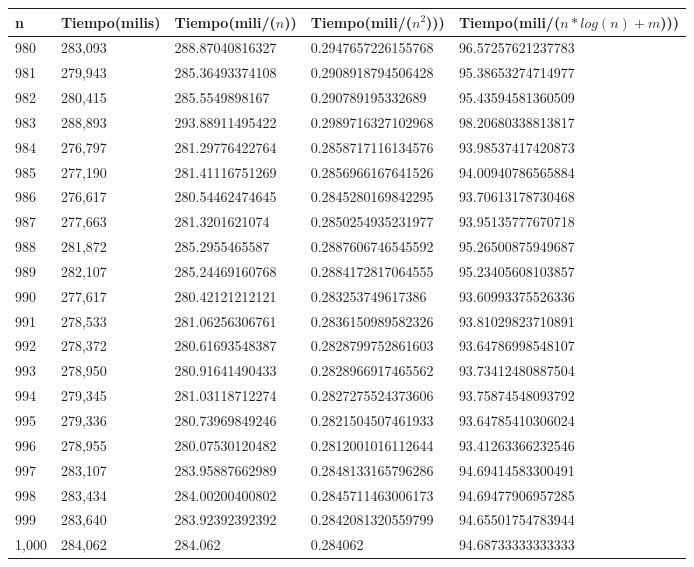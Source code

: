 \begin{table}[H]
\parbox{0.3\textwidth}{
    \begin{tabular}{ | l | l | l | l | l |}
    \hline
n   &Tiempo(milis) &Tiempo(mili/($n$)) &Tiempo(mili/($n^2$))) &Tiempo(mili/($n*log(n) + m$)))\\ \hline
980	&283,093	&288.87040816327	&0.2947657226155768	&96.57257621237783\\ \hline
981	&279,943	&285.36493374108	&0.2908918794506428	&95.38653274714977\\ \hline
982	&280,415	&285.5549898167	    &0.290789195332689	&95.43594581360509\\ \hline
983	&288,893	&293.88911495422	&0.2989716327102968	&98.20680338813817\\ \hline
984	&276,797	&281.29776422764	&0.2858717116134576	&93.98537417420873\\ \hline
985	&277,190	&281.41116751269	&0.2856966167641526	&94.00940786565884\\ \hline
986	&276,617	&280.54462474645	&0.2845280169842295	&93.70613178730468\\ \hline
987	&277,663	&281.3201621074	    &0.2850254935231977	&93.95135777670718\\ \hline
988	&281,872	&285.2955465587	    &0.2887606746545592	&95.26500875949687\\ \hline
989	&282,107	&285.24469160768	&0.2884172817064555	&95.23405608103857\\ \hline
990	&277,617	&280.42121212121	&0.283253749617386	&93.60993375526336\\ \hline
991	&278,533	&281.06256306761	&0.2836150989582326	&93.81029823710891\\ \hline
992	&278,372	&280.61693548387	&0.2828799752861603	&93.64786998548107\\ \hline
993	&278,950	&280.91641490433	&0.2828966917465562	&93.73412480887504\\ \hline
994	&279,345	&281.03118712274	&0.2827275524373606	&93.75874548093792\\ \hline
995	&279,336	&280.73969849246	&0.2821504507461933	&93.64785410306024\\ \hline
996	&278,955	&280.07530120482	&0.2812001016112644	&93.41263366232546\\ \hline
997	&283,107	&283.95887662989	&0.2848133165796286	&94.69414583300491\\ \hline
998	&283,434	&284.00200400802	&0.2845711463006173	&94.69477906957285\\ \hline
999	&283,640	&283.92392392392	&0.2842081320559799	&94.65501754783944\\ \hline
1,000	&284,062	&284.062	&0.284062	&94.68733333333333\\ \hline
    \end{tabular}
}
\end{table}

